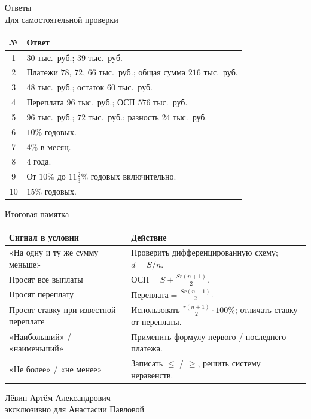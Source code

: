 \documentclass[a4paper,12pt]{article}
\begin{document}
\clearpage
\begin{center}
{\LARGE\color{darkaccent}Ответы}\\[3mm]
{\small Для самостоятельной проверки}
\end{center}

\begin{tabularx}{\linewidth}{@{}cX@{}}
\toprule
№ & Ответ\\
\midrule
1 & $30$ тыс.\ руб.; $39$ тыс.\ руб.\\
2 & Платежи $78$, $72$, $66$ тыс.\ руб.;
общая сумма $216$ тыс.\ руб.\\
3 & $48$ тыс.\ руб.; остаток $60$ тыс.\ руб.\\
4 & Переплата $96$ тыс.\ руб.; ОСП $576$ тыс.\ руб.\\
5 & $96$ тыс.\ руб.; $72$ тыс.\ руб.; разность $24$ тыс.\ руб.\\
6 & $10\%$ годовых.\\
7 & $4\%$ в месяц.\\
8 & $4$ года.\\
9 & От $10\%$ до $11\frac23\%$ годовых включительно.\\
10 & $15\%$ годовых.\\
\bottomrule
\end{tabularx}

\vspace{12mm}
{\large\color{darkaccent}Итоговая памятка}

\begin{tabularx}{\linewidth}{@{}p{49mm}X@{}}
\toprule
Сигнал в условии & Действие\\
\midrule
«На одну и ту же сумму меньше» &
Проверить дифференцированную схему; $d=S/n$.\\
Просят все выплаты & $\text{ОСП}=S+\frac{Sr(n+1)}2$.\\
Просят переплату & $\text{Переплата}=\frac{Sr(n+1)}2$.\\
Просят ставку при известной переплате &
Использовать $\frac{r(n+1)}2\cdot100\%$; отличать ставку от переплаты.\\
«Наибольший» / «наименьший» &
Применить формулу первого / последнего платежа.\\
«Не более» / «не менее» &
Записать $\le$ / $\ge$, решить систему неравенств.\\
\bottomrule
\end{tabularx}

\vfill
\begin{center}
\footnotesize\color{quiet}
Лёвин Артём Александрович\\
эксклюзивно для Анастасии Павловой
\end{center}
\end{document}
